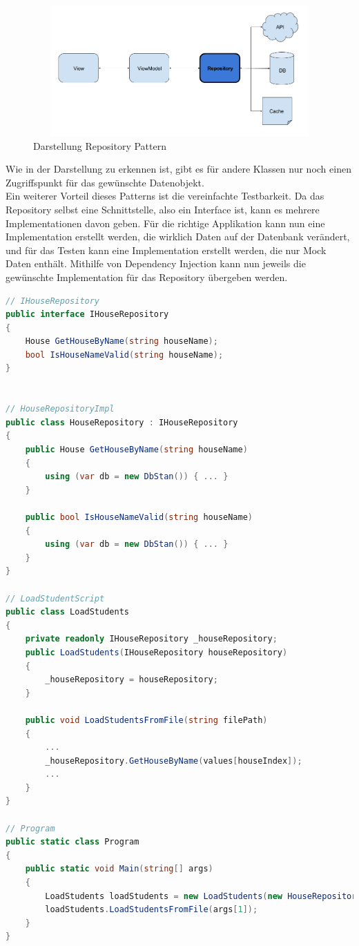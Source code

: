 \documentclass[a4paper, table]{article}
\begin{document}
\begin{figure}[h]
    \centering
    \includegraphics[width=1\textwidth,height=5cm]{img/Repository_Pattern.png}
    \caption{Darstellung Repository Pattern}
    \label{fig:repository_pattern}
\end{figure}
Wie in der Darstellung zu erkennen ist, gibt es für andere Klassen nur noch einen Zugriffspunkt für das gewünschte Datenobjekt.\\
Ein weiterer Vorteil dieses Patterns ist die vereinfachte Testbarkeit. 
Da das Repository selbst eine Schnittstelle, also ein Interface ist, kann es mehrere Implementationen davon geben. 
Für die richtige Applikation kann nun eine Implementation erstellt werden, die wirklich Daten auf der Datenbank verändert, und für das Testen kann eine Implementation erstellt werden, die nur Mock Daten enthält.
Mithilfe von Dependency Injection kann nun jeweils die gewünschte Implementation für das Repository übergeben werden.

\begin{lstlisting}[language=csharp]
// IHouseRepository
public interface IHouseRepository
{
    House GetHouseByName(string houseName);
    bool IsHouseNameValid(string houseName);
}


// HouseRepositoryImpl
public class HouseRepository : IHouseRepository
{
    public House GetHouseByName(string houseName)
    {
        using (var db = new DbStan()) { ... }
    }

    public bool IsHouseNameValid(string houseName)
    {
        using (var db = new DbStan()) { ... }
    }
}

// LoadStudentScript
public class LoadStudents
{
    private readonly IHouseRepository _houseRepository;
    public LoadStudents(IHouseRepository houseRepository)
    {
        _houseRepository = houseRepository;
    }

    public void LoadStudentsFromFile(string filePath)
    {
        ...
        _houseRepository.GetHouseByName(values[houseIndex]);
        ...
    }
}

// Program
public static class Program
{
    public static void Main(string[] args)
    {
        LoadStudents loadStudents = new LoadStudents(new HouseRepository());
        loadStudents.LoadStudentsFromFile(args[1]);
    }
}
\end{lstlisting}
\end{document}
